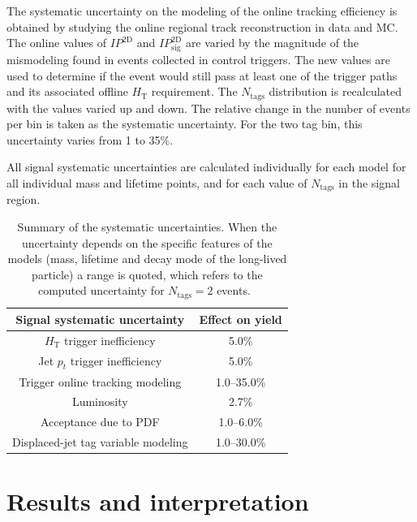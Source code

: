 The systematic uncertainty on the modeling of the online tracking
efficiency is obtained by studying the online regional track
reconstruction in data and MC. The online values of $IP^{\textrm{2D}}$
and $IP^{\textrm{2D}}_{\textrm{sig}}$ are varied by the magnitude of
the mismodeling found in events collected in control triggers.  The
new values are used to determine if the event would still pass at
least one of the trigger paths and its associated offline
$H_{\textrm{T}}$ requirement. The $N_{\textrm{tags}}$ distribution is
recalculated with the values varied up and down. The relative change
in the number of events per bin is taken as the systematic
uncertainty. For the two tag bin, this uncertainty varies from
1 to 35\%.

All signal systematic uncertainties are calculated individually for
each model for all individual mass and lifetime points, and for each
value of $N_\text{tags}$ in the signal region.

\begin{table}[tb]
  \caption{Summary of the systematic uncertainties. 
    When the uncertainty depends on the specific features of the models
    (mass, lifetime and decay mode of the long-lived particle) a
    range is quoted, which refers to the computed uncertainty for $N_{\textrm{tags}}=2$ events.~\label{tab:sigSys}}
\begin{center}
\begin{tabular}{cc}
\textbf{Signal systematic uncertainty} & \textbf{Effect on yield} \\
\hline
$H_{\textrm{T}}$ trigger inefficiency &  5.0\% \\
Jet $p_{t}$ trigger inefficiency  & 5.0\% \\
Trigger online tracking modeling & 1.0--35.0\% \\
Luminosity & 2.7\% \\
Acceptance due to PDF & 1.0--6.0\% \\
Displaced-jet tag variable modeling & 1.0--30.0\% \\
\end{tabular}
\end{center}
\end{table}

\section{Results and interpretation}
\label{sec:results}

